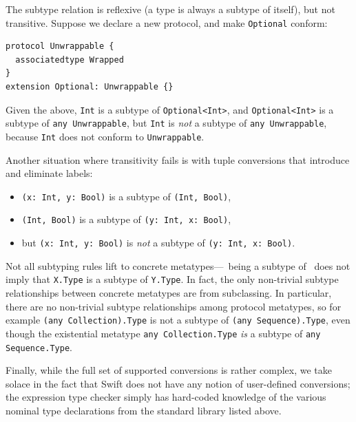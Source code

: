 \documentclass[../generics]{subfiles}
\begin{document}
\begin{example}
The subtype relation is reflexive (a type is always a subtype of itself), but not transitive. Suppose we declare a new protocol, and make \texttt{Optional} conform:
\begin{Verbatim}
protocol Unwrappable {
  associatedtype Wrapped
}
extension Optional: Unwrappable {}
\end{Verbatim}
Given the above, \texttt{Int} is a subtype of \texttt{Optional<Int>}, and \texttt{Optional<Int>} is a subtype of \texttt{any~Unwrappable}, but \texttt{Int} is \emph{not} a subtype of \texttt{any~Unwrappable}, because \texttt{Int} does not conform to \texttt{Unwrappable}.
\end{example}

\begin{example}
Another situation where transitivity fails is with tuple conversions that introduce and eliminate labels:
\begin{itemize}
\item \verb|(x: Int, y: Bool)| is a subtype of \verb|(Int, Bool)|,
\item \verb|(Int, Bool)| is a subtype of \verb|(y: Int, x: Bool)|,
\item but \verb|(x: Int, y: Bool)| is \emph{not} a subtype of \verb|(y: Int, x: Bool)|.
\end{itemize}
\end{example}

\begin{example}
Not all subtyping rules lift to concrete metatypes---\tX\ being a subtype of \tY\ does not imply that \texttt{X.Type} is a subtype of \texttt{Y.Type}. In fact, the only non-trivial subtype relationships between concrete metatypes are from subclassing. In particular, there are no non-trivial subtype relationships among protocol metatypes, so for example \texttt{(any Collection).Type} is not a subtype of \texttt{(any Sequence).Type}, even though the existential metatype \texttt{any Collection.Type} \emph{is} a subtype of \texttt{any Sequence.Type}.
\end{example}

Finally, while the full set of supported conversions is rather complex, we take solace in the fact that Swift does not have any notion of user-defined conversions; the expression type checker simply has hard-coded knowledge of the various nominal type declarations from the standard library listed above.
\end{document}
